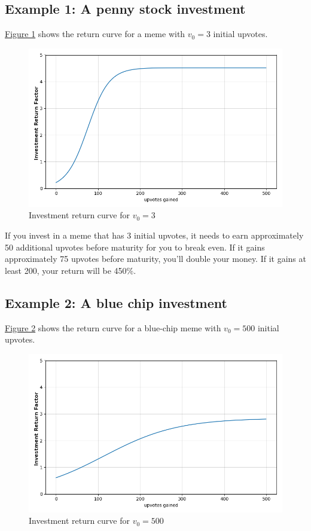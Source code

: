 \documentclass[a4paper, 12pt]{article}
\begin{document}
\subsection*{Example 1: A penny stock investment}
\label{sec:orge1b1276}

\hyperref[fig:orgb260c37]{Figure 1} shows the return curve for a meme with \(v_0 = 3\) initial upvotes.

\begin{figure}[H]
\centering
\includegraphics[width=.9\linewidth]{./paper_figure_1.png}
\caption{\label{fig:orgb260c37}
Investment return curve for \(v_0 = 3\)}
\end{figure}

If you invest in a meme that has 3 initial upvotes, it needs to earn approximately 50
additional upvotes before maturity for you to break even. If it gains
approximately 75 upvotes before maturity, you'll double your money. If it gains
at least 200, your return will be 450\%.

\subsection*{Example 2: A blue chip investment}
\label{sec:orgbad28fe}

\hyperref[fig:org56720b9]{Figure 2} shows the return curve for a blue-chip meme with \(v_0 = 500\)
initial upvotes.

\begin{figure}[H]
\centering
\includegraphics[width=.9\linewidth]{./paper_figure_2.png}
\caption{\label{fig:org56720b9}
Investment return curve for \(v_0 = 500\)}
\end{figure}
\end{document}

